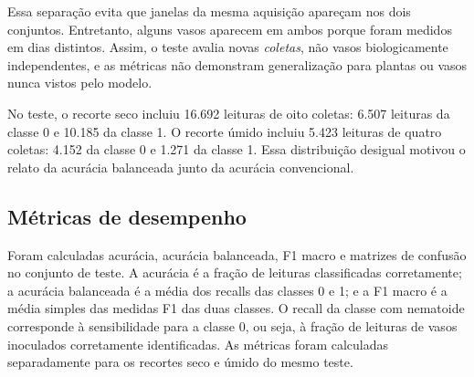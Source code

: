 Essa separação evita que janelas da mesma aquisição apareçam nos dois
conjuntos. Entretanto, alguns vasos aparecem em ambos porque foram medidos
em dias distintos. Assim, o teste avalia novas \emph{coletas}, não vasos
biologicamente independentes, e as métricas não demonstram generalização
para plantas ou vasos nunca vistos pelo modelo.

No teste, o recorte seco incluiu 16.692 leituras de oito coletas: 6.507
leituras da classe 0 e 10.185 da classe 1. O recorte úmido incluiu 5.423
leituras de quatro coletas: 4.152 da classe 0 e 1.271 da classe 1. Essa
distribuição desigual motivou o relato da acurácia balanceada junto da
acurácia convencional.

\subsection{Métricas de desempenho}
\label{subsec:metricas}

Foram calculadas acurácia, acurácia balanceada, F1 macro e matrizes de
confusão no conjunto de teste. A acurácia é a fração de leituras
classificadas corretamente; a acurácia balanceada é a média dos recalls
das classes 0 e 1; e a F1 macro é a média simples das medidas F1 das duas
classes. O recall da classe com nematoide corresponde à sensibilidade
para a classe 0, ou seja, à fração de leituras de vasos inoculados
corretamente identificadas. As métricas foram calculadas separadamente
para os recortes seco e úmido do mesmo teste.
